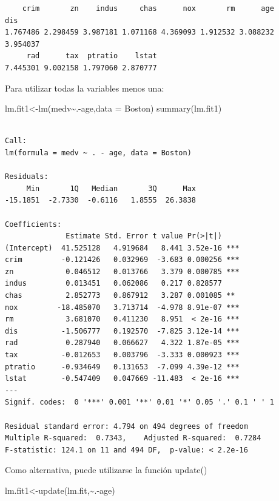 \documentclass[
  letterpaper,
  DIV=11,
  numbers=noendperiod]{scrartcl}
\newenvironment{Shaded}{\begin{snugshade}}{\end{snugshade}}
\newcommand{\AttributeTok}[1]{\textcolor[rgb]{0.40,0.45,0.13}{#1}}
\newcommand{\FunctionTok}[1]{\textcolor[rgb]{0.28,0.35,0.67}{#1}}
\newcommand{\NormalTok}[1]{\textcolor[rgb]{0.00,0.23,0.31}{#1}}
\newcommand{\OtherTok}[1]{\textcolor[rgb]{0.00,0.23,0.31}{#1}}
\newcommand{\SpecialCharTok}[1]{\textcolor[rgb]{0.37,0.37,0.37}{#1}}
\begin{document}
\begin{verbatim}
    crim       zn    indus     chas      nox       rm      age      dis 
1.767486 2.298459 3.987181 1.071168 4.369093 1.912532 3.088232 3.954037 
     rad      tax  ptratio    lstat 
7.445301 9.002158 1.797060 2.870777 
\end{verbatim}

Para utilizar todas la variables menos una:

\begin{Shaded}
\begin{Highlighting}[]
\NormalTok{lm.fit1}\OtherTok{\textless{}{-}}\FunctionTok{lm}\NormalTok{(medv}\SpecialCharTok{\textasciitilde{}}\NormalTok{.}\SpecialCharTok{{-}}\NormalTok{age,}\AttributeTok{data =}\NormalTok{ Boston)}
\FunctionTok{summary}\NormalTok{(lm.fit1)}
\end{Highlighting}
\end{Shaded}

\begin{verbatim}

Call:
lm(formula = medv ~ . - age, data = Boston)

Residuals:
     Min       1Q   Median       3Q      Max 
-15.1851  -2.7330  -0.6116   1.8555  26.3838 

Coefficients:
              Estimate Std. Error t value Pr(>|t|)    
(Intercept)  41.525128   4.919684   8.441 3.52e-16 ***
crim         -0.121426   0.032969  -3.683 0.000256 ***
zn            0.046512   0.013766   3.379 0.000785 ***
indus         0.013451   0.062086   0.217 0.828577    
chas          2.852773   0.867912   3.287 0.001085 ** 
nox         -18.485070   3.713714  -4.978 8.91e-07 ***
rm            3.681070   0.411230   8.951  < 2e-16 ***
dis          -1.506777   0.192570  -7.825 3.12e-14 ***
rad           0.287940   0.066627   4.322 1.87e-05 ***
tax          -0.012653   0.003796  -3.333 0.000923 ***
ptratio      -0.934649   0.131653  -7.099 4.39e-12 ***
lstat        -0.547409   0.047669 -11.483  < 2e-16 ***
---
Signif. codes:  0 '***' 0.001 '**' 0.01 '*' 0.05 '.' 0.1 ' ' 1

Residual standard error: 4.794 on 494 degrees of freedom
Multiple R-squared:  0.7343,    Adjusted R-squared:  0.7284 
F-statistic: 124.1 on 11 and 494 DF,  p-value: < 2.2e-16
\end{verbatim}

Como alternativa, puede utilizarse la función update()

\begin{Shaded}
\begin{Highlighting}[]
\NormalTok{lm.fit1}\OtherTok{\textless{}{-}}\FunctionTok{update}\NormalTok{(lm.fit,}\SpecialCharTok{\textasciitilde{}}\NormalTok{.}\SpecialCharTok{{-}}\NormalTok{age)}
\end{Highlighting}
\end{Shaded}
\end{document}

